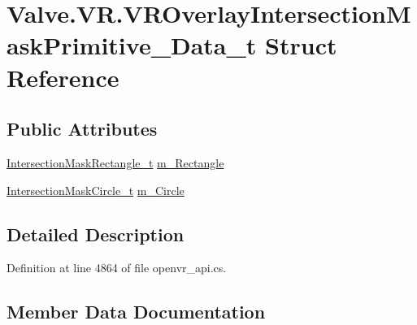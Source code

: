 \hypertarget{struct_valve_1_1_v_r_1_1_v_r_overlay_intersection_mask_primitive___data__t}{}\section{Valve.\+V\+R.\+V\+R\+Overlay\+Intersection\+Mask\+Primitive\+\_\+\+Data\+\_\+t Struct Reference}
\label{struct_valve_1_1_v_r_1_1_v_r_overlay_intersection_mask_primitive___data__t}
\subsection*{Public Attributes}
\begin{DoxyCompactItemize}
\item 
\mbox{\hyperlink{struct_valve_1_1_v_r_1_1_intersection_mask_rectangle__t}{Intersection\+Mask\+Rectangle\+\_\+t}} \mbox{\hyperlink{struct_valve_1_1_v_r_1_1_v_r_overlay_intersection_mask_primitive___data__t_af8e6184ad0bcc0413c4143428a6e9db6}{m\+\_\+\+Rectangle}}
\item 
\mbox{\hyperlink{struct_valve_1_1_v_r_1_1_intersection_mask_circle__t}{Intersection\+Mask\+Circle\+\_\+t}} \mbox{\hyperlink{struct_valve_1_1_v_r_1_1_v_r_overlay_intersection_mask_primitive___data__t_ad39f2f255b82ad28b35a6b817a5d409e}{m\+\_\+\+Circle}}
\end{DoxyCompactItemize}


\subsection{Detailed Description}


Definition at line 4864 of file openvr\+\_\+api.\+cs.



\subsection{Member Data Documentation}
\mbox{\label{struct_valve_1_1_v_r_1_1_v_r_overlay_intersection_mask_primitive___data__t_ad39f2f255b82ad28b35a6b817a5d409e}} 

